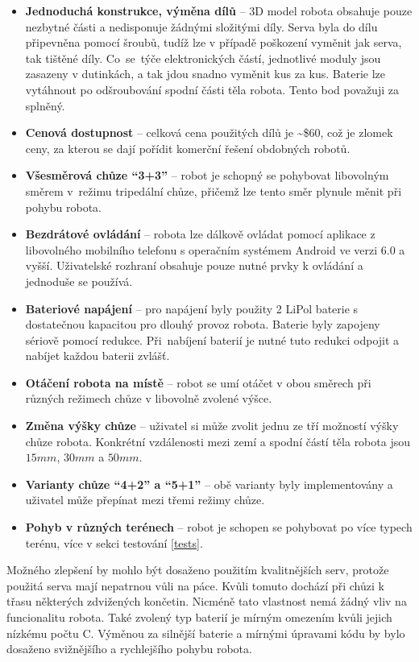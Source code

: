 \begin{itemize}
    \item \textbf{Jednoduchá konstrukce, výměna dílů} -- 3D model robota obsahuje pouze nezbytné části a nedisponuje žádnými složitými díly. Serva byla do dílu připevněna pomocí šroubů, tudíž lze v případě poškození vyměnit jak serva, tak tištěné díly. Co~se~týče elektronických částí, jednotlivé moduly jsou zasazeny v dutinkách, a tak jdou snadno vyměnit kus za kus. Baterie lze vytáhnout po odšroubování spodní části těla robota. Tento bod považuji za splněný.
    \item \textbf{Cenová dostupnost} -- celková cena použitých dílů je \textasciitilde\$60, což je zlomek ceny, za kterou se dají pořídit komerční řešení obdobných robotů.
    \item \textbf{Všesměrová chůze ``3+3''} -- robot je schopný se pohybovat libovolným směrem v~režimu tripedální chůze, přičemž lze tento směr plynule měnit při pohybu robota.
    \item \textbf{Bezdrátové ovládání} -- robota lze dálkově ovládat pomocí aplikace z libovolného mobilního telefonu s operačním systémem Android ve verzi 6.0 a vyšší. Uživatelské rozhraní obsahuje pouze nutné prvky k ovládání a jednoduše se používá.
    \item \textbf{Bateriové napájení} -- pro napájení byly použity 2 LiPol baterie s dostatečnou kapacitou pro dlouhý provoz robota. Baterie byly zapojeny sériově pomocí redukce. Při~nabíjení baterií je nutné tuto redukci odpojit a nabíjet každou baterii zvlášť.
    \item \textbf{Otáčení robota na místě} -- robot se umí otáčet v obou směrech při různých režimech chůze v libovolně zvolené výšce.
    \item \textbf{Změna výšky chůze} -- uživatel si může zvolit jednu ze tří možností výšky chůze robota. Konkrétní vzdálenosti mezi zemí a spodní částí těla robota jsou $15mm$, $30mm$ a $50mm$.
    \item \textbf{Varianty chůze ``4+2'' a ``5+1''} -- obě varianty byly implementovány a uživatel může přepínat mezi třemi režimy chůze.
    \item \textbf{Pohyb v různých terénech} -- robot je schopen se pohybovat po více typech terénu, více v sekci testování \ref{tests}.
\end{itemize}

Možného zlepšení by mohlo být dosaženo použitím kvalitnějších serv, protože použitá serva mají nepatrnou vůli na páce. Kvůli tomuto dochází při chůzi k třasu některých zdvižených končetin. Nicméně tato vlastnost nemá žádný vliv na funcionalitu robota. Také zvolený typ baterií je mírným omezením kvůli jejich nízkému počtu C. Výměnou za silnější baterie a mírnými úpravami kódu by bylo dosaženo svižnějšího a rychlejšího pohybu robota.


